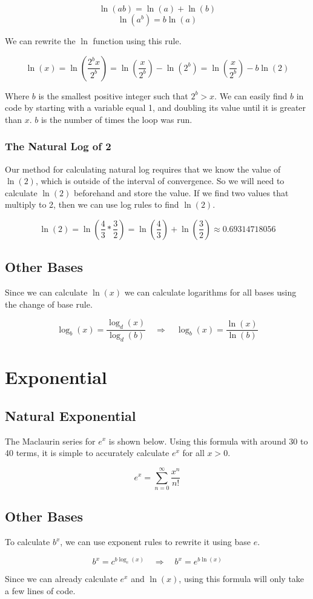 \documentclass[12pt, letterpaper]{article}
\begin{document}
\[ \ln(ab) = \ln(a) + \ln(b) \]
\[ \ln(a^b) = b\ln(a) \]

We can rewrite the $\ln$ function using this rule.

\[ \ln(x) = \ln\left(\frac{2^bx}{2^b}\right) = \ln\left(\frac{x}{2^b}\right) - \ln\left(2^b\right) = \ln\left(\frac{x}{2^b}\right) - b\ln\left(2\right) \]

Where $b$ is the smallest positive integer such that $2^b>x$. We can easily find $b$ in code by starting with a variable equal 1, and doubling its value until it is greater than $x$. $b$ is the number of times the loop was run.

\subsubsection{The Natural Log of 2}
Our method for calculating natural log requires that we know the value of $\ln(2)$, which is outside of the interval of convergence. So we will need to calculate $\ln(2)$ beforehand and store the value. If we find two values that multiply to 2, then we can use log rules to find $\ln(2)$.

\[ \ln(2) = \ln\left(\frac{4}{3} * \frac{3}{2}\right) = \ln\left(\frac{4}{3}\right) + \ln\left(\frac{3}{2}\right) \approx 0.69314718056 \]

\subsection{Other Bases}
Since we can calculate $\ln(x)$ we can calculate logarithms for all bases using the change of base rule.

\[ \log_b(x) = \frac{\log_d(x)}{\log_d(b)} \quad \Rightarrow \quad \log_b(x) = \frac{\ln(x)}{\ln(b)} \]

\section{Exponential}
\subsection{Natural Exponential}
The Maclaurin series for $e^x$ is shown below. Using this formula with around 30 to 40 terms, it is simple to accurately calculate $e^x$ for all $x>0$.

\[ e^x = \sum_{n=0}^{\infty}\frac{x^n}{n!} \]

\subsection{Other Bases}

To calculate $b^x$, we can use exponent rules to rewrite it using base $e$.

\[ b^x = c^{b\log_c(x)} \quad \Rightarrow \quad b^x = e^{b\ln(x)} \]

Since we can already calculate $e^x$ and $\ln(x)$, using this formula will only take a few lines of code.
\end{document}

